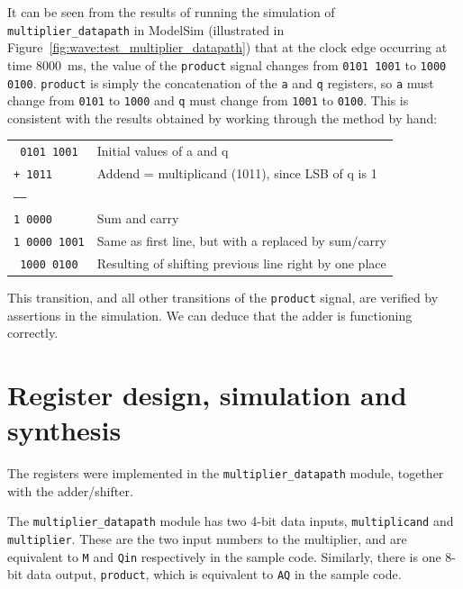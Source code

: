 \documentclass[a4paper]{article}
\begin{document}
It can be seen from the results of running the simulation of \texttt{multiplier\_datapath} in ModelSim (illustrated in Figure~\ref{fig:wave:test_multiplier_datapath}) that at the clock edge occurring at time \SI{8000}{\milli\second}, the value of the \texttt{product} signal changes from \texttt{0101 1001} to \texttt{1000 0100}. \texttt{product} is simply the concatenation of the \texttt{a} and \texttt{q} registers, so \texttt{a} must change from \texttt{0101} to \texttt{1000} and \texttt{q} must change from \texttt{1001} to \texttt{0100}. This is consistent with the results obtained by working through the method by hand:

\vspace{10pt}
\begin{tabular}{ll}
\texttt{  0101 1001} & Initial values of a and q \\
\texttt{+ 1011     } & Addend = multiplicand (1011), since LSB of q is 1 \\
\texttt{------     } & \\
\texttt{1 0000     } & Sum and carry \\
\texttt{1 0000 1001} & Same as first line, but with a replaced by sum/carry \\
\texttt{  1000 0100} & Resulting of shifting previous line right by one place \\
\end{tabular}
\vspace{10pt}

This transition, and all other transitions of the \texttt{product} signal, are verified by assertions in the simulation. We can deduce that the adder is functioning correctly.

\section{Register design, simulation and synthesis}
\label{seg:reg}

The registers were implemented in the \texttt{multiplier\_datapath} module, together with the adder/shifter.

The \texttt{multiplier\_datapath} module has two 4-bit data inputs, \texttt{multiplicand} and \texttt{multiplier}. These are the two input numbers to the multiplier, and are equivalent to \texttt{M} and \texttt{Qin} respectively in the sample code. Similarly, there is one 8-bit data output, \texttt{product}, which is equivalent to \texttt{AQ} in the sample code.
\end{document}
